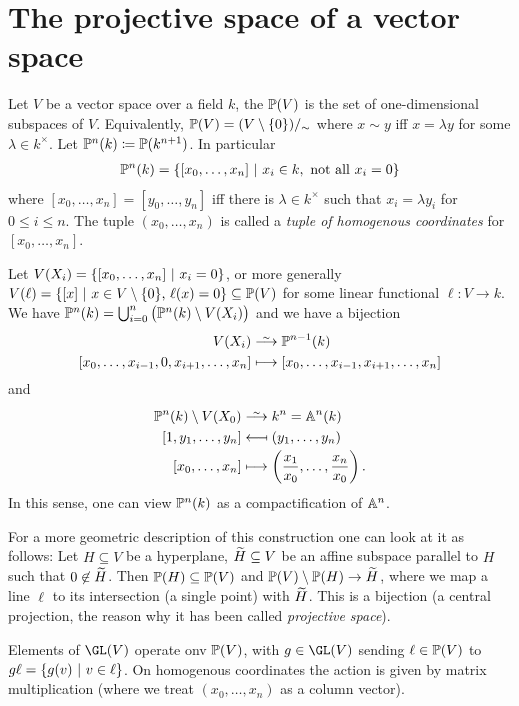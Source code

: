 \documentclass[a4paper,parskip=half,numbers=enddot, DIV=12]{scrreprt}
\begin{document}
\section{The projective space of a vector space}

\begin{defi}
    Let $V$ be a vector space over a field $k$, the  $\mathbb{P}(V)$ is the set of one-dimensional subspaces of $V$. Equivalently, $\mathbb{P}(V)=(V\setminus\{0\})/_\sim$ where $x\sim y$ iff $x=\lambda y$ for some $\lambda\in k^\times$. Let $\mathbb{P}^n(k) \coloneqq \mathbb{P}(k^{n+1})$. In particular
    \begin{align*}
        \mathbb{P}^n(k) = \left\{[x_0,\ldots, x_n]\ \middle|\  x_i\in k, \text{ not all } x_i=0\right\}
    \end{align*}
    where $[x_0,\ldots, x_n] = [y_0,\ldots,y_n]$ iff there is $\lambda\in k^\times$ such that $x_i=\lambda y_i$ for $0\leq i\leq n$. The tuple $(x_0,\ldots, x_n)$ is called a \emph{tuple of homogenous coordinates} for $[x_0,\ldots,x_n]$. 
    
    Let $V(X_i) = \left\{[x_0,\ldots, x_n]\ \middle|\  x_i=0 \right\}$, or more generally $V(\ell) = \left\{ [x] \ \middle|\  x\in V\setminus\{0\}\text{, }\ell(x) = 0\right\}\subseteq \mathbb{P}(V)$ for some linear functional $\ell\colon V\to k$. We have $\mathbb{P}^n(k) = \bigcup_{i=0}^n \big(\mathbb{P}^n(k) \setminus V(X_i)\big)$ and we have a bijection
    \begin{align*}
        V(X_i) &\isomorphism \IP^{n-1} (k)\\
        [x_0,\ldots, x_{i-1},0,x_{i+1}, \ldots, x_n] &\longmapsto [x_0,\ldots, x_{i-1},x_{i+1}, \ldots, x_n]
    \end{align*}
    and 
    \begin{align*}
        \IP^n(k)\setminus V(X_0) &\isomorphism k^n = \IA^n(k)\\
        [1,y_1,\ldots, y_n] &\longmapsfrom (y_1,\ldots, y_n)\\
        [x_0,\ldots, x_n] &\longmapsto \left(\frac{x_1}{x_0}, \ldots, \frac{x_n}{x_0}\right).
    \end{align*}
    In this sense, one can view $\mathbb{P}^n(k)$ as a compactification of $\mathbb{A}^n$. 
    
    For a more geometric description of this construction one can look at it as follows: Let $H\subseteq V$ be a hyperplane, $\snake H\subseteq V$ be an affine subspace parallel to $H$ such that $0\not\in \snake H$. Then $\mathbb{P}(H) \subseteq \mathbb{P}(V)$ and $\IP(V)\setminus \IP(H) \to \snake H$, where we map a line $\ell$ to its intersection (a single point) with $\snake H$. This is a bijection (a central projection, the reason why it has been called \emph{projective space}).
    
    Elements of $\GL(V)$ operate onv $\mathbb{P}(V)$, with $g\in \GL(V)$ sending $\ell\in \mathbb{P}(V)$ to $g\ell = \left\{g(v)\ \middle|\  v\in \ell\right\}$. On homogenous coordinates the action is given by matrix multiplication (where we treat $(x_0,\ldots,x_n)$ as a column vector). 
\end{defi}
\end{document}
